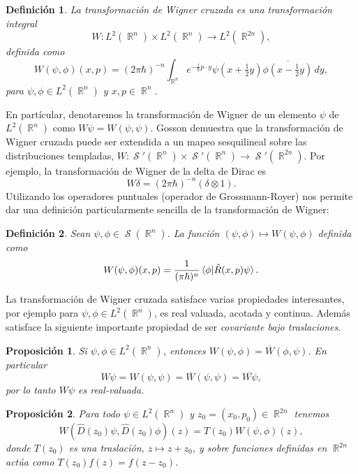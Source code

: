 \documentclass[a4paper]{report}
\DeclareMathOperator{\R}{\mathbb{R}}
\DeclareMathOperator{\Sz}{\mathcal S}
\newtheorem{definition}{Definición}
\newtheorem{proposition}{Proposición}
\begin{document}
  \begin{definition}
    La transformación de Wigner cruzada es una
    transformación integral
    \[
      W : L^2(\R^{n}) \times L^2(\R^{n}) \to L^2(\R^{2n}),
    \]
    definida como
    \begin{equation}
      \label{eqn:cross_wigner_transform}
      W(\psi,\phi)(x,p)
      = (2\pi\hbar)^{-n} \int_{\R^{n}} e^{-\frac{i}{\hbar} p
      \cdot y} \psi(x + \tfrac{1}{2}y) \overline{\phi(x -
      \tfrac{1}{2}y)} \, dy,
    \end{equation}
    para $\psi, \phi \in L^2(\R^{n})$ y $x,p \in \R^{n}$.  
  \end{definition}
  En partícular, denotaremos la transformación de Wigner de
  un elemento $\psi$ de $L^2(\R^{n})$ como $W\psi =
  W(\psi,\psi)$. Gosson demuestra que la transformación de
  Wigner cruzada puede ser extendida a un mapeo sesquilineal
  sobre las distribuciones templadas, $W : \Sz'(\R^{n})
  \times \Sz'(\R^{n}) \to \Sz'(\R^{2n})$. Por ejemplo, la
  transformación de Wigner de la delta de Dirac es
  \[
    W\delta = (2\pi\hbar)^{-n} (\delta \otimes 1).
  \] 
  Utilizando los operadores puntuales (operador de
  Grossmann-Royer) nos permite dar una definición
  particularmente sencilla de la transformación de Wigner:
  \begin{definition}
    Sean $\psi,\phi \in \Sz(\R^{n})$. La función
    $(\psi,\phi) \mapsto W(\psi,\phi)$ definida como
    \begin{equation}
      W(\psi,\phi)(x,p)
      = \frac{1}{(\pi\hbar)^{n}} \braket{\phi|
      \hat{R}(x,p)\psi}.
    \end{equation}
  \end{definition}
  La transformación de Wigner cruzada satisface varias
  propiedades interesantes, por ejemplo para $\psi, \phi \in
  L^2(\R^{n})$, es real valuada, acotada y continua. Además
  satisface la siguiente importante propiedad de ser
  \textit{covariante bajo traslaciones}. 
  \begin{proposition}
    Si $\psi, \phi \in L^2(\R^{n})$, entonces $W(\psi,\phi)
    = \overline{W}(\phi,\psi)$. En particular
    \[
      W\psi
      = W(\psi,\psi)
      = \overline{W}(\psi,\psi)
      = \overline{W\psi},
    \] 
    por lo tanto $W\psi$ es real-valuada. 
  \end{proposition}
  \begin{proposition}
    Para todo $\psi \in L^2(\R^{n})$ y $z_0 = (x_0,p_0) \in
    \R^{2n}$ tenemos
    \[
      W(\hat{D}(z_0)\psi, \hat{D}(z_0)\phi)(z)
      = T(z_0)W(\psi,\phi)(z),
    \] 
    donde $T(z_0)$ es una traslación, $z \mapsto z + z_0$, y
    sobre funciones definidas en $\R^{2n}$ actúa como
    $T(z_0)f(z) = f(z-z_0)$.
  \end{proposition}
  
\end{document}
